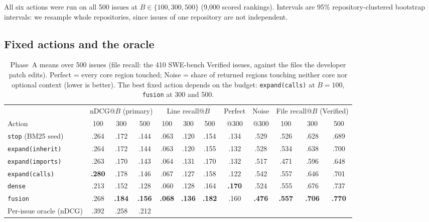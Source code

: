 \documentclass[11pt]{article}
\newcommand{\action}[1]{\texttt{#1}}
\begin{document}
All six actions were run on all 500 issues at $B \in \{100, 300, 500\}$ (9,000
scored rankings). Intervals are 95\% repository-clustered bootstrap
intervals: we resample whole repositories, since issues of one repository are
not independent.

\subsection{Fixed actions and the oracle}

\begin{table}[t]
\centering
\small
\begin{tabular}{@{}l ccc ccc c c ccc@{}}
\toprule
 & \multicolumn{3}{c}{nDCG@$B$ (primary)} & \multicolumn{3}{c}{Line recall@$B$} & Perfect & Noise & \multicolumn{3}{c}{File recall@$B$ (Verified)} \\
\cmidrule(lr){2-4}\cmidrule(lr){5-7}\cmidrule(lr){10-12}
Action & 100 & 300 & 500 & 100 & 300 & 500 & @300 & @300 & 100 & 300 & 500 \\
\midrule
\action{stop} (BM25 seed) & .264 & .172 & .144 & .063 & .120 & .154 & .134 & .529 & .526 & .628 & .689 \\
\action{expand(inherit)}  & .264 & .172 & .144 & .063 & .120 & .155 & .132 & .528 & .534 & .638 & .700 \\
\action{expand(imports)}  & .263 & .170 & .143 & .064 & .131 & .170 & .132 & .517 & .471 & .596 & .648 \\
\action{expand(calls)}    & \textbf{.280} & .178 & .146 & .067 & .127 & .158 & .122 & .542 & .557 & .646 & .701 \\
\action{dense}            & .213 & .152 & .128 & .060 & .128 & .164 & \textbf{.170} & .524 & .555 & .676 & .737 \\
\action{fusion}           & .268 & \textbf{.184} & \textbf{.156} & \textbf{.068} & \textbf{.136} & \textbf{.182} & .160 & \textbf{.476} & \textbf{.557} & \textbf{.706} & \textbf{.770} \\
\midrule
Per-issue oracle (nDCG) & .392 & .258 & .212 & & & & & & & & \\
\bottomrule
\end{tabular}
\caption{Phase~A means over 500 issues (file recall: the 410 SWE-bench Verified
issues, against the files the developer patch edits). Perfect = every core
region touched; Noise = share of returned regions touching neither core nor
optional context (lower is better). The best fixed action depends on the
budget: \action{expand(calls)} at $B=100$, \action{fusion} at 300 and 500.}
\label{tab:main}
\end{table}
\end{document}
